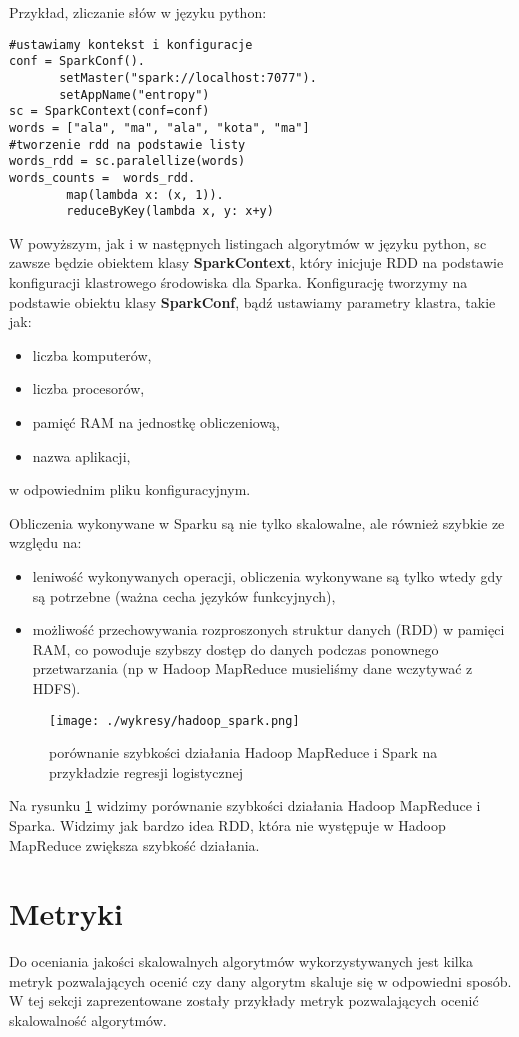 \documentclass[magisterska]{pracamgr}
\theoremstyle{plain}
\theoremstyle{definition}
\theoremstyle{remark}
\begin{document}
Przykład, zliczanie słów w języku python:
\begin{lstlisting}
#ustawiamy kontekst i konfiguracje
conf = SparkConf().
       setMaster("spark://localhost:7077").
       setAppName("entropy")
sc = SparkContext(conf=conf)
words = ["ala", "ma", "ala", "kota", "ma"]
#tworzenie rdd na podstawie listy
words_rdd = sc.paralellize(words)  
words_counts =  words_rdd.
		map(lambda x: (x, 1)).
		reduceByKey(lambda x, y: x+y)
\end{lstlisting}

W powyższym, jak i w następnych listingach algorytmów w języku python, sc zawsze będzie obiektem klasy \textbf{SparkContext}, który inicjuje
RDD na podstawie konfiguracji klastrowego środowiska dla Sparka. Konfigurację tworzymy na podstawie obiektu klasy \textbf{SparkConf}, bądź
ustawiamy parametry klastra, takie jak:
\begin{itemize}
 \item liczba komputerów,
 \item liczba procesorów,
 \item pamięć RAM na jednostkę obliczeniową,
 \item nazwa aplikacji,
\end{itemize}
w odpowiednim pliku konfiguracyjnym. 


Obliczenia wykonywane w Sparku są nie tylko skalowalne, ale również szybkie ze względu na:
\begin{itemize}
 \item leniwość wykonywanych operacji, obliczenia wykonywane są tylko wtedy gdy są potrzebne (ważna cecha
 języków funkcyjnych),
 \item możliwość przechowywania rozproszonych struktur danych (RDD) w pamięci RAM, co powoduje szybszy dostęp do danych
 podczas ponownego przetwarzania (np w Hadoop MapReduce musieliśmy dane wczytywać z HDFS).
\end{itemize}


\begin{figure}
 \caption{porównanie szybkości działania Hadoop MapReduce i Spark na przykładzie regresji logistycznej}\label{fig:hadoop_spark}
 \texttt{[image: ./wykresy/hadoop\_spark.png]}
\end{figure}

Na rysunku \ref{fig:hadoop_spark} widzimy porównanie szybkości działania Hadoop MapReduce i Sparka. Widzimy jak bardzo idea RDD, która 
nie występuje w Hadoop MapReduce zwiększa szybkość działania.

\section{Metryki}
Do oceniania jakości skalowalnych algorytmów wykorzystywanych jest kilka metryk pozwalających
 ocenić czy dany algorytm skaluje się w odpowiedni sposób. W tej sekcji zaprezentowane zostały przykłady
 metryk pozwalających ocenić skalowalność algorytmów.
 
\end{document}
